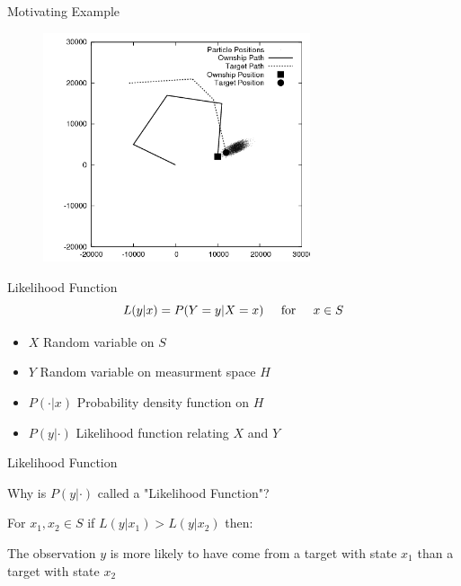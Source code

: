 \documentclass{beamer}
\begin{document}
\begin{frame}{Motivating Example}
\begin{figure}
\centering
\includegraphics[width=0.7\textwidth]{data/azimuth_only_4000.png}
\end{figure}
\end{frame}


\begin{frame}{Likelihood Function}
\begin{equation}
L(y|x) = P( Y=y | X=x ) \hspace{0.5cm} \mbox{for} \hspace{0.5cm} x \in S
\end{equation}

\vspace{1cm}

\begin{itemize}
\item \(X\) Random variable on \(S\)
\item \(Y\) Random variable on measurment space \(H\)
\item \(P(\cdot|x)\) Probability density function on \(H\)
\item \(P(y|\cdot)\) Likelihood function relating \(X\) and \(Y\)
\end{itemize}

\end{frame}



\begin{frame}{Likelihood Function}

Why is \(P(y|\cdot)\) called a "Likelihood Function"?

\vspace{1cm}

For \hspace{0.25cm} \(x_{1}, x_{2} \in S \) \hspace{0.25cm} if \hspace{0.25cm} \(L(y|x_{1})>L(y|x_{2})\) \hspace{0.25cm} then:

\vspace{1cm}

The observation \(y\) is more likely to have come from a target with state \(x_{1}\) than a target with state \(x_{2}\)

\end{frame}
\end{document}
